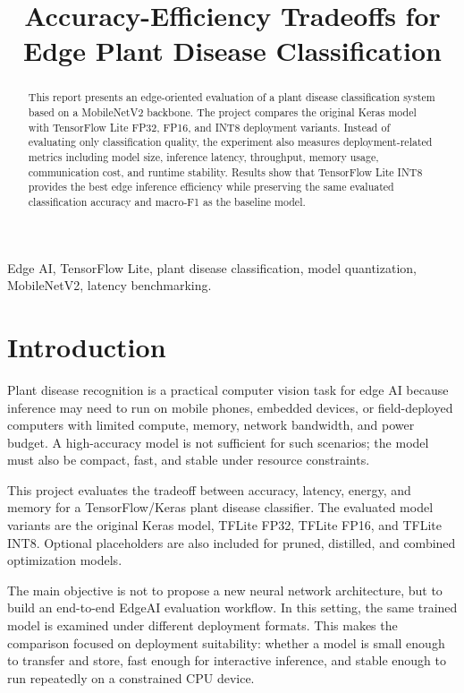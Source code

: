 \documentclass[10pt,journal,onecolumn]{IEEEtran}
\title{Accuracy-Efficiency Tradeoffs for Edge Plant Disease Classification}
\author{
\IEEEauthorblockN{Qijiacheng 1235371 Lan Xinyue1235697 Chen Chengxuan 1234763}

\IEEEauthorblockA{
CPS 4851 Edge Crop Disease AI Project\\
TensorFlow/Keras and TensorFlow Lite
}
}
\begin{document}
\maketitle

\begin{abstract}
This report presents an edge-oriented evaluation of a plant disease classification system based on a MobileNetV2 backbone. The project compares the original Keras model with TensorFlow Lite FP32, FP16, and INT8 deployment variants. Instead of evaluating only classification quality, the experiment also measures deployment-related metrics including model size, inference latency, throughput, memory usage, communication cost, and runtime stability. Results show that TensorFlow Lite INT8 provides the best edge inference efficiency while preserving the same evaluated classification accuracy and macro-F1 as the baseline model.
\end{abstract}

\begin{IEEEkeywords}
Edge AI, TensorFlow Lite, plant disease classification, model quantization, MobileNetV2, latency benchmarking.
\end{IEEEkeywords}

\section{Introduction}
Plant disease recognition is a practical computer vision task for edge AI because inference may need to run on mobile phones, embedded devices, or field-deployed computers with limited compute, memory, network bandwidth, and power budget. A high-accuracy model is not sufficient for such scenarios; the model must also be compact, fast, and stable under resource constraints.

This project evaluates the tradeoff between accuracy, latency, energy, and memory for a TensorFlow/Keras plant disease classifier. The evaluated model variants are the original Keras model, TFLite FP32, TFLite FP16, and TFLite INT8. Optional placeholders are also included for pruned, distilled, and combined optimization models.

The main objective is not to propose a new neural network architecture, but to build an end-to-end EdgeAI evaluation workflow. In this setting, the same trained model is examined under different deployment formats. This makes the comparison focused on deployment suitability: whether a model is small enough to transfer and store, fast enough for interactive inference, and stable enough to run repeatedly on a constrained CPU device.
\end{document}
